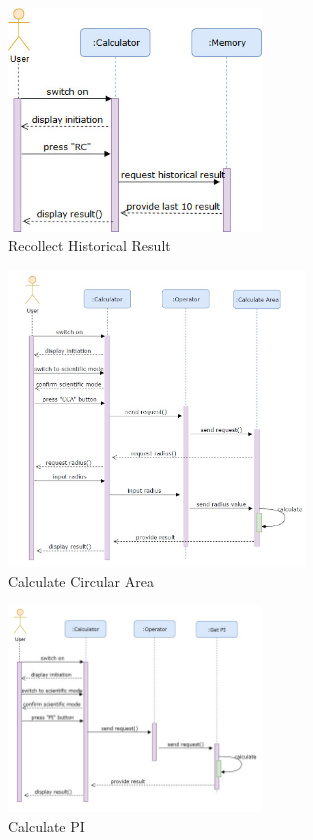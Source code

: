 \begin{figure}[H]
\centering  %
\includegraphics[width=0.6\textwidth]{images/SD/rl10r.jpg}
\caption{Recollect Historical Result}
\end{figure}

\begin{figure}[H]
\centering  %
\includegraphics[width=0.7\textwidth]{images/SD/cca.jpg}
\caption{Calculate Circular Area}
\end{figure}

\begin{figure}[H]
\centering  %
\includegraphics[width=0.6\textwidth]{images/SD/getpi.jpg}
\caption{Calculate PI}
\end{figure}

